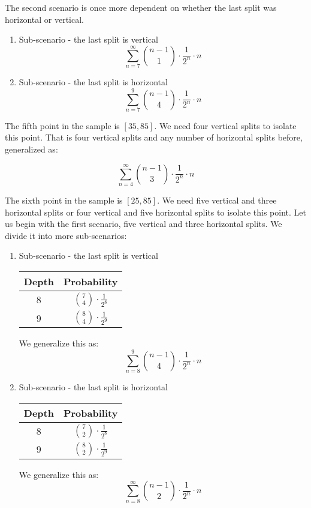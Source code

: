 The second scenario is once more dependent on whether the last split was horizontal or vertical.

\begin{enumerate}
    \item Sub-scenario - the last split is vertical
    $$\sum_{n=7}^{\infty}\binom{n-1}{1}\cdot \frac{1}{2^n}\cdot n$$
    \item Sub-scenario - the last split is horizontal
    $$\sum_{n=7}^{9}\binom{n-1}{4}\cdot \frac{1}{2^n}\cdot n$$
\end{enumerate}

The fifth point in the sample is $[35,85]$.  We need four vertical splits to isolate this point. That is four vertical splits and any number of horizontal splits before, generalized as:

$$\sum_{n=4}^{\infty}\binom{n-1}{3}\cdot \frac{1}{2^n}\cdot n$$

The sixth point in the sample is $[25,85]$. We need five vertical and three horizontal splits or four vertical and five horizontal splits to isolate this point.
Let us begin with the first scenario, five vertical and three horizontal splits. We divide it into more sub-scenarios:

\begin{enumerate}
    \item Sub-scenario - the last split is vertical
\begin{center}
\begin{tabular}{||c c||} 
 \hline
 Depth & Probability \\ [1ex] 
 \hline
 8 & $\binom{7}{4}\cdot \frac{1}{2^8}$\\ 
 \hline
 9 & $\binom{8}{4}\cdot \frac{1}{2^9}$  \\[1ex] 
 \hline
\end{tabular}
\end{center}
We generalize this as: 
$$\sum_{n=8}^{9}\binom{n-1}{4}\cdot \frac{1}{2^n}\cdot n$$
\item Sub-scenario - the last split is horizontal
    \begin{center}
\begin{tabular}{||c c||} 
 \hline
 Depth & Probability \\ [1ex] 
 \hline
 8 & $\binom{7}{2}\cdot \frac{1}{2^8}$\\ 
 \hline
 9 & $\binom{8}{2}\cdot \frac{1}{2^9}$  \\[1ex] 
 \hline
\end{tabular}
\end{center}
We generalize this as: 
$$\sum_{n=8}^{\infty}\binom{n-1}{2}\cdot \frac{1}{2^n}\cdot n$$
\end{enumerate}

